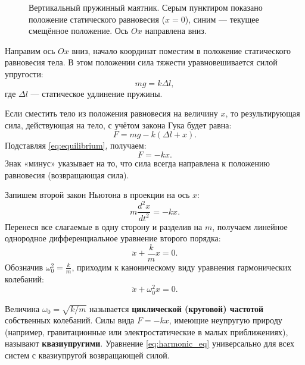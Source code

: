 \begin{theorem}
\begin{figure}[htbp]
\begin{tikzpicture}
    \end{tikzpicture}
    \caption{Вертикальный пружинный маятник. Серым пунктиром показано положение статического равновесия ($x=0$), синим --- текущее смещённое положение. Ось $Ox$ направлена вниз.}
    \label{fig:vertical_spring}
\end{figure}


Направим ось $Ox$ вниз, начало координат поместим в положение статического равновесия тела. В этом положении сила тяжести уравновешивается силой упругости:
\begin{equation}
    mg = k \Delta l, \label{eq:equilibrium}
\end{equation}
где $\Delta l$ --- статическое удлинение пружины.

Если сместить тело из положения равновесия на величину $x$, то результирующая сила, действующая на тело, с учётом закона Гука будет равна:
\begin{equation}
    F = mg - k(\Delta l + x).
\end{equation}
Подставляя \eqref{eq:equilibrium}, получаем:
\begin{equation}
    F = -kx. \label{eq:restoring}
\end{equation}
Знак «минус» указывает на то, что сила всегда направлена к положению равновесия (возвращающая сила).

Запишем второй закон Ньютона в проекции на ось $x$:
\begin{equation}
    m \frac{d^2x}{dt^2} = -kx.
\end{equation}
Перенеся все слагаемые в одну сторону и разделив на $m$, получаем линейное однородное дифференциальное уравнение второго порядка:
\begin{equation}
    \ddot{x} + \frac{k}{m}x = 0.
\end{equation}
Обозначив $\omega_0^2 = \frac{k}{m}$, приходим к каноническому виду уравнения гармонических колебаний:
\begin{equation}
    \ddot{x} + \omega_0^2 x = 0. \label{eq:harmonic_eq}
\end{equation}
\end{theorem}

\begin{remark}
Величина $\omega_0 = \sqrt{k/m}$ называется \textbf{циклической (круговой) частотой} собственных колебаний. Силы вида $F = -kx$, имеющие неупругую природу (например, гравитационные или электростатические в малых приближениях), называют \textbf{квазиупругими}. Уравнение \eqref{eq:harmonic_eq} универсально для всех систем с квазиупругой возвращающей силой.
\end{remark}
